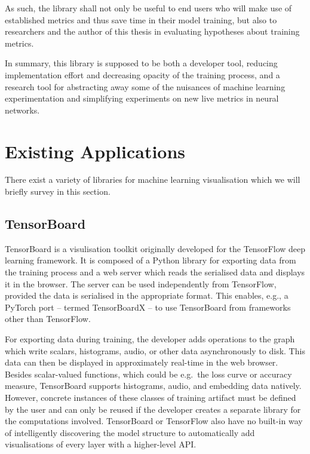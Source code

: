 As such, the library shall not only be useful to end users who will make use of
established metrics and thus save time in their model training, but also to
researchers and the author of this thesis in evaluating hypotheses about
training metrics.

In summary, this library is supposed to be both a developer tool, reducing
implementation effort and decreasing opacity of the training process, and a
research tool for abstracting away some of the nuisances of machine learning
experimentation and simplifying experiments on new live metrics in neural networks.

\hypertarget{sec:existing-apps}{%
\section{Existing Applications}\label{sec:existing-apps}}

There exist a variety of libraries for machine learning visualisation which we
will briefly survey in this section.

\hypertarget{tensorboard}{%
\subsection*{TensorBoard}\label{tensorboard}}

TensorBoard is a visulisation toolkit originally developed for the TensorFlow
\citep{tensorflow2015-whitepaper} deep learning framework. It is composed of a
Python library for exporting data from the training process and a web server
which reads the serialised data and displays it in the browser. The server can
be used independently from TensorFlow, provided the data is serialised in the
appropriate format. This enables, e.g., a PyTorch port -- termed TensorBoardX -- to
use TensorBoard from frameworks other than TensorFlow.

For exporting data during training, the developer adds operations to the
graph which write scalars, histograms, audio, or other data
asynchronously to disk. This data can then be displayed in approximately
real-time in the web browser. Besides scalar-valued functions, which
could be e.g.~the loss curve or accuracy measure, TensorBoard supports
histograms, audio, and embedding data natively. However, concrete
instances of these classes of training artifact must be defined by the
user and can only be reused if the developer creates a separate library
for the computations involved. TensorBoard or TensorFlow also have no built-in
way of intelligently discovering the model structure to automatically add
visualisations of every layer with a higher-level API.

